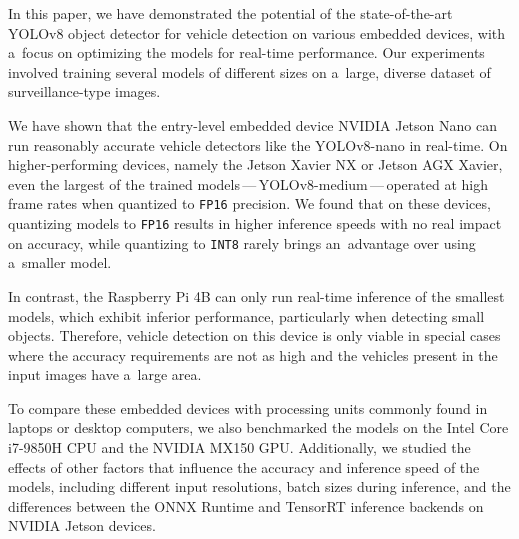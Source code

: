 



In this paper, we have demonstrated the potential of the state-of-the-art YOLOv8
object detector for vehicle detection on various embedded devices, with a~focus
on optimizing the models for real-time performance. Our experiments involved
training several models of different sizes on a~large, diverse dataset of
surveillance-type images.

We have shown that the entry-level embedded device NVIDIA Jetson Nano can run
reasonably accurate vehicle detectors like the YOLOv8-nano in real-time. On
higher-performing devices, namely the Jetson Xavier NX or Jetson AGX Xavier,
even the largest of the trained models\,---\,YOLOv8-medium\,---\,operated at high
frame rates when quantized to \texttt{FP16} precision. We found that on these
devices, quantizing models to \texttt{FP16} results in higher inference speeds
with no real impact on accuracy, while quantizing to \texttt{INT8} rarely brings
an~advantage over using a~smaller model.

In contrast, the Raspberry Pi 4B can only run real-time inference of the
smallest models, which exhibit inferior performance, particularly when detecting
small objects. Therefore, vehicle detection on this device is only viable in
special cases where the accuracy requirements are not as high and the vehicles
present in the input images have a~large area.

To compare these embedded devices with processing units commonly found in
laptops or desktop computers, we also benchmarked the models on the Intel Core
i7-9850H CPU and the NVIDIA MX150 GPU. Additionally, we studied the effects of
other factors that influence the accuracy and inference speed of the models,
including different input resolutions, batch sizes during inference, and the
differences between the ONNX Runtime and TensorRT inference backends on NVIDIA
Jetson devices.

